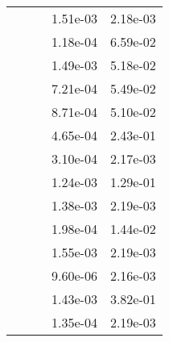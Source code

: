 \begin{table}
\begin{tabular}{c|cc|cc|}
\multicolumn{1}{|c|}{} & \multicolumn{1}{|c|}{} & \multicolumn{1}{|c|}{} & \multicolumn{1}{|c|}{  1.51e-03} & \multicolumn{1}{|c|}{  2.18e-03} \\ 
\multicolumn{1}{|c|}{} & \multicolumn{1}{|c|}{} & \multicolumn{1}{|c|}{} & \multicolumn{1}{|c|}{  1.18e-04} & \multicolumn{1}{|c|}{  6.59e-02} \\ 
\multicolumn{1}{|c|}{} & \multicolumn{1}{|c|}{} & \multicolumn{1}{|c|}{} & \multicolumn{1}{|c|}{  1.49e-03} & \multicolumn{1}{|c|}{  5.18e-02} \\ 
\multicolumn{1}{|c|}{} & \multicolumn{1}{|c|}{} & \multicolumn{1}{|c|}{} & \multicolumn{1}{|c|}{  7.21e-04} & \multicolumn{1}{|c|}{  5.49e-02} \\ 
\multicolumn{1}{|c|}{} & \multicolumn{1}{|c|}{} & \multicolumn{1}{|c|}{} & \multicolumn{1}{|c|}{  8.71e-04} & \multicolumn{1}{|c|}{  5.10e-02} \\ 
\multicolumn{1}{|c|}{} & \multicolumn{1}{|c|}{} & \multicolumn{1}{|c|}{} & \multicolumn{1}{|c|}{  4.65e-04} & \multicolumn{1}{|c|}{  2.43e-01} \\ 
\multicolumn{1}{|c|}{} & \multicolumn{1}{|c|}{} & \multicolumn{1}{|c|}{} & \multicolumn{1}{|c|}{  3.10e-04} & \multicolumn{1}{|c|}{  2.17e-03} \\ 
\multicolumn{1}{|c|}{} & \multicolumn{1}{|c|}{} & \multicolumn{1}{|c|}{} & \multicolumn{1}{|c|}{  1.24e-03} & \multicolumn{1}{|c|}{  1.29e-01} \\ 
\multicolumn{1}{|c|}{} & \multicolumn{1}{|c|}{} & \multicolumn{1}{|c|}{} & \multicolumn{1}{|c|}{  1.38e-03} & \multicolumn{1}{|c|}{  2.19e-03} \\ 
\multicolumn{1}{|c|}{} & \multicolumn{1}{|c|}{} & \multicolumn{1}{|c|}{} & \multicolumn{1}{|c|}{  1.98e-04} & \multicolumn{1}{|c|}{  1.44e-02} \\ 
\multicolumn{1}{|c|}{} & \multicolumn{1}{|c|}{} & \multicolumn{1}{|c|}{} & \multicolumn{1}{|c|}{  1.55e-03} & \multicolumn{1}{|c|}{  2.19e-03} \\ 
\multicolumn{1}{|c|}{} & \multicolumn{1}{|c|}{} & \multicolumn{1}{|c|}{} & \multicolumn{1}{|c|}{  9.60e-06} & \multicolumn{1}{|c|}{  2.16e-03} \\ 
\multicolumn{1}{|c|}{} & \multicolumn{1}{|c|}{} & \multicolumn{1}{|c|}{} & \multicolumn{1}{|c|}{  1.43e-03} & \multicolumn{1}{|c|}{  3.82e-01} \\ 
\multicolumn{1}{|c|}{} & \multicolumn{1}{|c|}{} & \multicolumn{1}{|c|}{} & \multicolumn{1}{|c|}{  1.35e-04} & \multicolumn{1}{|c|}{  2.19e-03} \\ 

\end{tabular}
\end{table}

